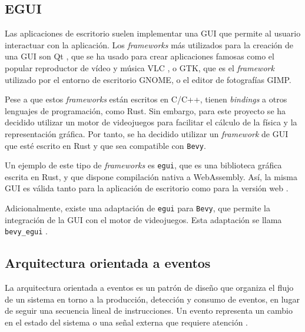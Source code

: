 \subsection{EGUI} \label{subsec:egui}

Las aplicaciones de escritorio suelen implementar una \ac{GUI} que permite al usuario interactuar con la aplicación. Los \textit{frameworks} más utilizados para la creación de una \ac{GUI} son Qt \autocite{Theqtstory}, que se ha usado para crear aplicaciones famosas como el popular reproductor de vídeo y música VLC \autocite{QtGTKVideoLAN}, o GTK, que es el \textit{framework} utilizado por el entorno de escritorio GNOME, o el editor de fotografías GIMP. 

Pese a que estos \textit{frameworks} están escritos en C/C++, tienen \textit{bindings} a otros lenguajes de programación, como Rust. Sin embargo, para este proyecto se ha decidido utilizar un motor de videojuegos para facilitar el cálculo de la física y la representación gráfica. Por tanto, se ha decidido utilizar un \textit{framework} de \ac{GUI} que esté escrito en Rust y que sea compatible con \texttt{Bevy}. 

Un ejemplo de este tipo de \textit{frameworks} es \texttt{egui}, que es una biblioteca gráfica escrita en Rust, y que dispone compilación nativa a WebAssembly. Así, la misma \ac{GUI} es válida tanto para la aplicación de escritorio como para la versión web \autocite{ernerfeldtEmilkEgui2025}.

Adicionalmente, existe una adaptación de \texttt{egui} para \texttt{Bevy}, que permite la integración de la \ac{GUI} con el motor de videojuegos. Esta adaptación se llama \texttt{bevy\_egui} \autocite{Bevy_eguiRust}. 

\subsection{Arquitectura orientada a eventos} \label{subsec:eventos}

La arquitectura orientada a eventos es un patrón de diseño que organiza el flujo de un sistema en torno a la producción, detección y consumo de eventos, en lugar de seguir una secuencia lineal de instrucciones. Un evento representa un cambio en el estado del sistema o una señal externa que requiere atención \autocite{SistemaComponentesEntidad2024}.

